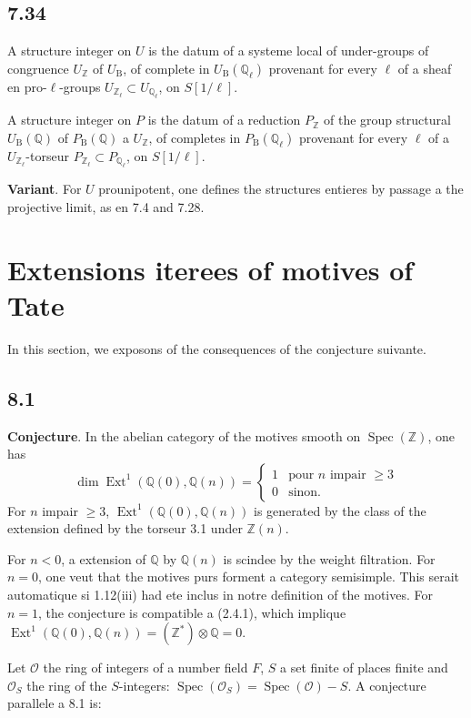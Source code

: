 \documentclass[12pt,a4paper]{article}
\theoremstyle{plain}
\theoremstyle{definition}
\theoremstyle{remark}
\DeclareMathOperator{\Spec}{Spec}
\DeclareMathOperator{\Ext}{Ext}
\newcommand{\B}{\mathrm{B}}
\newcommand{\Z}{\mathbb{Z}}
\newcommand{\Q}{\mathbb{Q}}
\begin{document}
\subsection*{7.34}
A structure integer on $U$ is the datum of a systeme local of under-groups of congruence $U_\Z$ of $U_\B$, of complete in $U_\B(\Q_\ell)$ provenant for every $\ell$ of a sheaf en pro-$\ell$-groups $U_{\Z_\ell} \subset U_{\Q_\ell}$, on $S[1/\ell]$.

A structure integer on $P$ is the datum of a reduction $P_\Z$ of the group structural $U_\B(\Q)$ of $P_\B(\Q)$ a $U_\Z$, of completes in $P_\B(\Q_\ell)$ provenant for every $\ell$ of a $U_{\Z_\ell}$-torseur $P_{\Z_\ell} \subset P_{\Q_\ell}$, on $S[1/\ell]$.

\textbf{Variant}. For $U$ prounipotent, one defines the structures entieres by passage a the projective limit, as en 7.4 and 7.28.

\section{Extensions iterees of motives of Tate}
\label{sec:8}

In this section, we exposons of the consequences of the conjecture suivante.

\subsection*{8.1}
\textbf{Conjecture}. In the abelian category of the motives smooth on $\Spec(\Z)$, one has
\begin{equation*}\tag{8.1.1}
\dim \Ext^1(\Q(0), \Q(n)) = \begin{cases} 1 & \text{pour $n$ impair $\geq 3$} \\ 0 & \text{sinon.} \end{cases}
\end{equation*}
For $n$ impair $\geq 3$, $\Ext^1(\Q(0), \Q(n))$ is generated by the class of the extension defined by the torseur 3.1 under $\Z(n)$.

For $n < 0$, a extension of $\Q$ by $\Q(n)$ is scindee by the weight filtration. For $n = 0$, one veut that the motives purs forment a category semisimple. This serait automatique si 1.12(iii) had ete inclus in notre definition of the motives. For $n = 1$, the conjecture is compatible a (2.4.1), which implique $\Ext^1(\Q(0), \Q(n)) = (\Z^*) \otimes \Q = 0$.

Let $\mathcal{O}$ the ring of integers of a number field $F$, $S$ a set finite of places finite and $\mathcal{O}_S$ the ring of the $S$-integers: $\Spec(\mathcal{O}_S) = \Spec(\mathcal{O}) - S$.
A conjecture parallele a 8.1 is:
\end{document}

